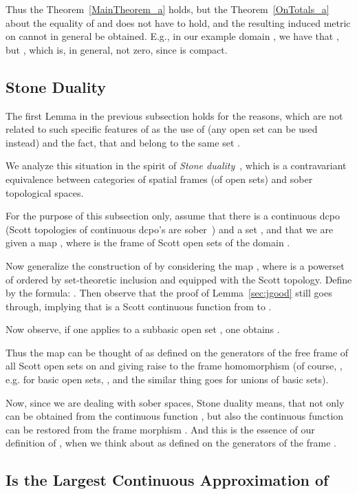 Thus the Theorem~\ref{MainTheorem_a} holds, but the 
Theorem~\ref{OnTotals_a}
about the equality of  and 
does not have to hold, and the resulting
induced metric on  cannot in general be obtained. E.g.,
in our example domain ,
we have that
, but 
, which
is, in general, not zero, since  is compact.

\subsection{Stone Duality}

The first Lemma in the previous subsection holds for the reasons,
which are not related to such specific
features of  as the use of  (any open set
can be used instead) and the fact, that
 and  belong to the same set .

We analyze this situation in the spirit of 
{\em Stone duality}~\cite{Johnstone,Vickers}, which is a contravariant
equivalence between categories of spatial frames (of open sets)
and sober topological spaces.

For the purpose of this subsection only, assume that there is
a continuous dcpo  (Scott topologies of continuous dcpo's are 
sober~\cite{Johnstone})
and a set , and that we are given a map ,
where  is the frame of Scott open sets of the
domain .

Now generalize the construction of  by considering the map
, where  is a powerset of 
ordered by set-theoretic inclusion and equipped with the Scott topology.
Define  by the formula: . 
Then observe that the proof of Lemma~\ref{sec:jgood}
still goes through, implying that  is a Scott continuous
function from  to .

Now observe, if one applies  to a subbasic
open set , one obtains \linebreak
.

Thus the map
 can be thought of as defined on the generators
 of the
free frame of all Scott open sets on 
and giving raise to the frame homomorphism
 (of course, ,
e.g. for basic open sets, , and the similar thing goes
for unions of basic sets).

Now, since we are dealing with sober spaces, Stone duality means,
that not only  can be obtained from the continuous
function , but also the continuous function  can be restored
from the frame morphism . And this is the essence of our
definition of , when we think about  as defined on the
generators of the frame .

\subsection{ Is the Largest Continuous Approximation of }

